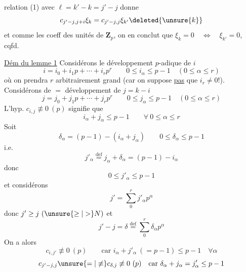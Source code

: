 relation (1) avec $\ell=k'-k=j'-j$ donne
\[
c_{j'-j,j+i}\xi_k=c_{j'-j,j}\xi_{k'}\deleted{\unsure{k}}
\]
et comme les coeff  des unités de $\mathbf Z_p$, on en conclut que $\xi_k=0\quad\Longleftrightarrow\quad\xi_{k'}=0$, cqfd.

\uline{Dém du lemme 1} Considérons le développement $p$-adique de $i$
\[
i=i_0+i_1p+\cdots+i_rp^r\qquad0\leq i_\alpha\leq p-1\quad(0\leq\alpha\leq r)
\]
où on prendra $r$ arbitrairement grand (car on suppose  \uline{pas} que $i_r\ne0$!). Considérons de $=$  développement de $j=k-i$
\[
j=j_0+j_1p+\cdots+j_rp^r\qquad0\leq j_\alpha\leq p-1\quad(0\leq\alpha\leq r)
\]
L'hyp. $c_{i,j}\not\equiv0\ (p)$ signifie que
\[
i_\alpha+j_\alpha\leq p-1\qquad\forall\ 0\leq\alpha\leq r
\]
Soit \deleted{$\unsure{\varepsilon_\alpha}$}
\[
\delta_\alpha=(p-1)-(i_\alpha+j_\alpha)\qquad0\leq\delta_\alpha\leq p-1
\]
i.e.
\[
j'_\alpha\overset{\mathrm{def}}=j_\alpha+\delta_\alpha=(p-1)-i_\alpha
\]
donc
\[
0\leq j'_\alpha\leq p-1
\]
et considérons
\[
j'=\sum_0^r j'_\alpha p^\alpha
\]
donc $j'\geq j\ (\unsure{\geq|>}N)$ et
\[
j'-j=\delta\overset{\mathrm{def}}=\sum_0^r\delta_\alpha p^\alpha
\]
On a alors 
\[
c_{i,j'}\not\equiv0\ (p)\qquad\text{car }i_\alpha+j'_\alpha\ (=p-1)\leq p-1\quad\forall\alpha
\]
\[
c_{j'-j,j}\unsure{=|\not\equiv}c_{\delta,j}\not\equiv0\ (p)\quad\text{car }\delta_\alpha+j_\alpha=j'_\alpha\leq p-1
\]
